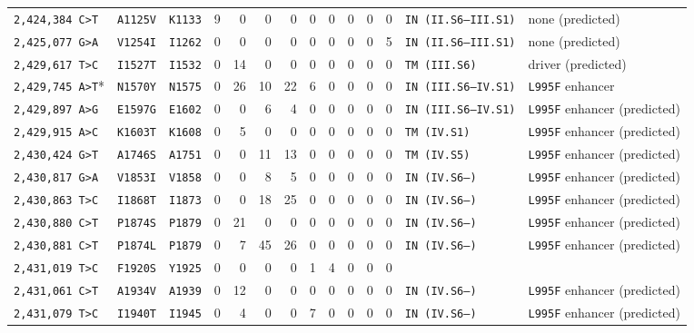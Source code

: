 \begin{tabular}{lllrrrrrrrrrll}
\texttt{2,424,384 C>T} & \texttt{A1125V} & \texttt{K1133} & 9 & 0 & 0 & 0 & 0 & 0 & 0 & 0 & 0 & \texttt{IN (II.S6--III.S1)} & none (predicted) \\

\texttt{2,425,077 G>A} & \texttt{V1254I} & \texttt{I1262} & 0 & 0 & 0 & 0 & 0 & 0 & 0 & 0 & 5 & \texttt{IN (II.S6--III.S1)} & none (predicted) \\

\texttt{2,429,617 T>C} & \texttt{I1527T} & \texttt{I1532} & 0 & 14 & 0 & 0 & 0 & 0 & 0 & 0 & 0 & \texttt{TM (III.S6)} & driver (predicted) \\

\texttt{2,429,745 A>T}* & \texttt{N1570Y} & \texttt{N1575} & 0 & 26 & 10 & 22 & 6 & 0 & 0 & 0 & 0 & \texttt{IN (III.S6--IV.S1)} & \texttt{L995F} enhancer \\

\texttt{2,429,897 A>G} & \texttt{E1597G} & \texttt{E1602} & 0 & 0 & 6 & 4 & 0 & 0 & 0 & 0 & 0 & \texttt{IN (III.S6--IV.S1)} & \texttt{L995F} enhancer (predicted) \\

\texttt{2,429,915 A>C} & \texttt{K1603T} & \texttt{K1608} & 0 & 5 & 0 & 0 & 0 & 0 & 0 & 0 & 0 & \texttt{TM (IV.S1)} & \texttt{L995F} enhancer (predicted) \\

\texttt{2,430,424 G>T} & \texttt{A1746S} & \texttt{A1751} & 0 & 0 & 11 & 13 & 0 & 0 & 0 & 0 & 0 & \texttt{TM (IV.S5)} & \texttt{L995F} enhancer (predicted) \\

\texttt{2,430,817 G>A} & \texttt{V1853I} & \texttt{V1858} & 0 & 0 & 8 & 5 & 0 & 0 & 0 & 0 & 0 & \texttt{IN (IV.S6--)} & \texttt{L995F} enhancer (predicted) \\

\texttt{2,430,863 T>C} & \texttt{I1868T} & \texttt{I1873} & 0 & 0 & 18 & 25 & 0 & 0 & 0 & 0 & 0 & \texttt{IN (IV.S6--)} & \texttt{L995F} enhancer (predicted) \\

\texttt{2,430,880 C>T} & \texttt{P1874S} & \texttt{P1879} & 0 & 21 & 0 & 0 & 0 & 0 & 0 & 0 & 0 & \texttt{IN (IV.S6--)} & \texttt{L995F} enhancer (predicted) \\

\texttt{2,430,881 C>T} & \texttt{P1874L} & \texttt{P1879} & 0 & 7 & 45 & 26 & 0 & 0 & 0 & 0 & 0 & \texttt{IN (IV.S6--)} & \texttt{L995F} enhancer (predicted) \\

\texttt{2,431,019 T>C} & \texttt{F1920S} & \texttt{Y1925} & 0 & 0 & 0 & 0 & 1 & 4 & 0 & 0 & 0 & \texttt{} &  \\

\texttt{2,431,061 C>T} & \texttt{A1934V} & \texttt{A1939} & 0 & 12 & 0 & 0 & 0 & 0 & 0 & 0 & 0 & \texttt{IN (IV.S6--)} & \texttt{L995F} enhancer (predicted) \\

\texttt{2,431,079 T>C} & \texttt{I1940T} & \texttt{I1945} & 0 & 4 & 0 & 0 & 7 & 0 & 0 & 0 & 0 & \texttt{IN (IV.S6--)} & \texttt{L995F} enhancer (predicted) \\

\bottomrule
\end{tabular}
